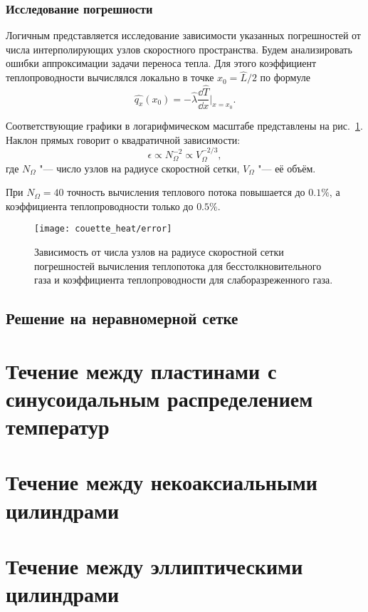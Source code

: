 \subsubsection{Исследование погрешности}

Логичным представляется исследование зависимости указанных погрешностей от числа интерполирующих узлов
скоростного пространства. Будем анализировать ошибки аппроксимации задачи переноса тепла.
Для этого коэффициент теплопроводности вычислялся локально в точке \(x_0=\hat L/2\) по формуле
\[ \hat{q_x}(x_0) = -\hat{\lambda}\frac{\dd\hat T}{\dd x}\bigg|_{x=x_0}. \]

Соответствующие графики в логарифмическом масштабе представлены на рис.~\ref{fig:error}.
Наклон прямых говорит о квадратичной зависимости:
\[ \epsilon \propto N_\Omega^{-2} \propto V_\Omega^{-2/3}, \]
где \(N_\Omega\) "--- число узлов на радиусе скоростной сетки, \(V_\Omega\) "--- её объём.

При \(N_\Omega = 40\) точность вычисления теплового потока повышается до \(0.1\%\),
а коэффициента теплопроводности только до \(0.5\%\).

\begin{figure}
    \centering
    \texttt{[image: couette\_heat/error]}
    \caption{
        Зависимость от числа узлов на радиусе скоростной сетки погрешностей вычисления
        теплопотока для бесстолкновительного газа и коэффициента теплопроводности для слаборазреженного газа.
    }\label{fig:error}
\end{figure}


\subsection{Решение на неравномерной сетке}


\section{Течение между пластинами с синусоидальным распределением температур} \label{sect:sone_bobylev}

\section{Течение между некоаксиальными цилиндрами} \label{sect:noncoaxial}

\section{Течение между эллиптическими цилиндрами} \label{sect:elliptic}

\clearpage
